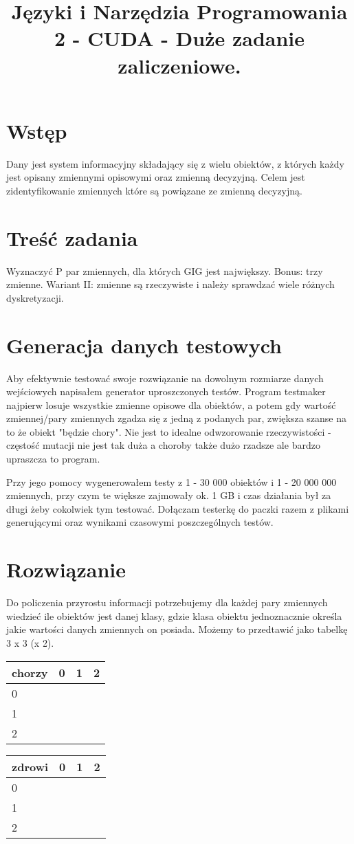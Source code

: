 \documentclass[a4paper]{article}
\title{Języki i Narzędzia Programowania 2 - CUDA - Duże zadanie zaliczeniowe.}
\begin{document}
    \maketitle
    \section{Wstęp}
    Dany jest system informacyjny składający się z wielu obiektów, z których każdy jest opisany zmiennymi opisowymi oraz zmienną decyzyjną. Celem jest zidentyfikowanie zmiennych które są powiązane ze zmienną decyzyjną.
    \section{Treść zadania}
    Wyznaczyć P par zmiennych, dla których GIG jest największy. Bonus: trzy zmienne. Wariant II: zmienne są rzeczywiste i należy sprawdzać wiele różnych dyskretyzacji.
    \section{Generacja danych testowych}
    Aby efektywnie testować swoje rozwiązanie na dowolnym rozmiarze danych wejściowych napisałem generator uproszczonych testów. Program testmaker najpierw losuje wszystkie zmienne opisowe dla obiektów, a potem gdy wartość zmiennej/pary zmiennych zgadza się z jedną z podanych par, zwiększa szanse na to że obiekt "będzie chory". Nie jest to idealne odwzorowanie rzeczywistości - częstość mutacji nie jest tak duża a choroby także dużo rzadsze ale bardzo upraszcza to program.

    Przy jego pomocy wygenerowałem testy z 1 - 30 000 obiektów i 1 - 20 000 000 zmiennych, przy czym te większe zajmowały ok. 1 GB i czas działania był za długi żeby cokolwiek tym testować. Dołączam testerkę do paczki razem z plikami generującymi oraz wynikami czasowymi poszczególnych testów.
    \section{Rozwiązanie}
    Do policzenia przyrostu informacji potrzebujemy dla każdej pary zmiennych wiedzieć ile obiektów jest danej klasy, gdzie klasa obiektu jednoznacznie określa jakie wartości danych zmiennych on posiada. Możemy to przedtawić jako tabelkę 3 x 3 (x 2).

    \begin{tabular}{|l|r|r|r|}
        \hline
        chorzy & 0 & 1 & 2 \\
        \hline
        0 & & & \\
        \hline
        1 & & & \\
        \hline
        2 & & & \\
        \hline
    \end{tabular}
    \begin{tabular}{|l|r|r|r|}
        \hline
        zdrowi & 0 & 1 & 2 \\
        \hline
        0 & & & \\
        \hline
        1 & & & \\
        \hline
        2 & & & \\
        \hline
    \end{tabular}
\end{document}
